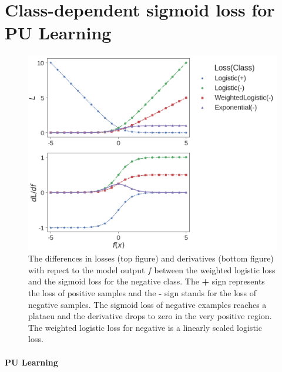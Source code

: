 \section{Class-dependent sigmoid loss for PU Learning}
\label{sec:pulearning}



\begin{figure}[t]
\centering
   \includegraphics[width=1.05\linewidth]{img/losses}
\caption{
The differences in losses (top figure) and derivatives (bottom figure) with repect to the model output $f$ between the weighted logistic loss and the sigmoid loss for the negative class.
The \textbf{+} sign represents the loss of positive samples and the \textbf{-} sign stands for the loss of negative samples.
The sigmoid loss of negative examples reaches a plataeu and the derivative drops to zero in the very positive region.
The weighted logistic loss for negative is a linearly scaled logistic loss.
}
\label{fig:losses}
\end{figure}


\paragraph{PU Learning}

